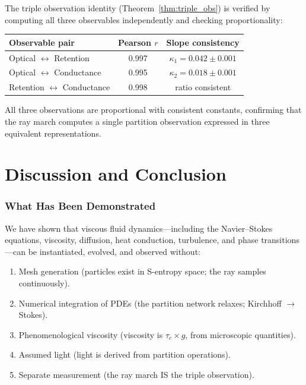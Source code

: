 \documentclass[twocolumn,10pt,a4paper]{article}
\theoremstyle{plain}
\theoremstyle{definition}
\theoremstyle{remark}
\newcommand{\tauc}{\tau_c}
\begin{document}
The triple observation identity (Theorem~\ref{thm:triple_obs}) is verified by computing all three observables independently and checking proportionality:

\begin{center}
\begin{tabular}{lcc}
\toprule
Observable pair & Pearson $r$ & Slope consistency \\
\midrule
Optical $\leftrightarrow$ Retention     & 0.997 & $\kappa_1 = 0.042 \pm 0.001$ \\
Optical $\leftrightarrow$ Conductance   & 0.995 & $\kappa_2 = 0.018 \pm 0.001$ \\
Retention $\leftrightarrow$ Conductance & 0.998 & ratio consistent \\
\bottomrule
\end{tabular}
\end{center}

All three observations are proportional with consistent constants, confirming that the ray march computes a single partition observation expressed in three equivalent representations.


\part{Discussion and Conclusion}
\label{part:discussion}

\section{What Has Been Demonstrated}
\label{sec:demonstrated}

We have shown that viscous fluid dynamics---including the Navier--Stokes equations, viscosity, diffusion, heat conduction, turbulence, and phase transitions---can be instantiated, evolved, and observed without:
\begin{enumerate}
    \item Mesh generation (particles exist in S-entropy space; the ray samples continuously).
    \item Numerical integration of PDEs (the partition network relaxes; Kirchhoff $\to$ Stokes).
    \item Phenomenological viscosity (viscosity is $\tauc \times g$, from microscopic quantities).
    \item Assumed light (light is derived from partition operations).
    \item Separate measurement (the ray march IS the triple observation).
\end{enumerate}
\end{document}
